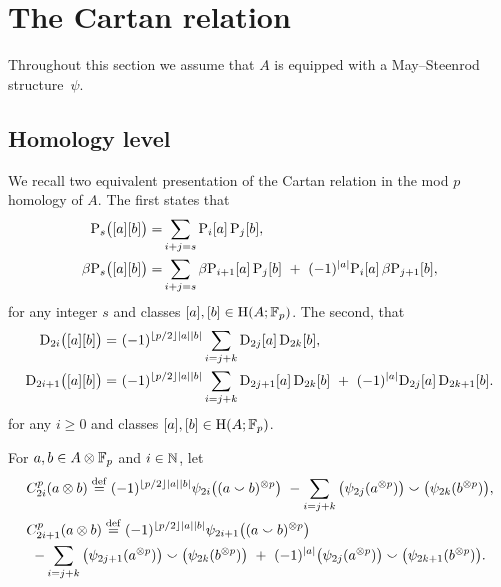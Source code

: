 
\section{The Cartan relation}\label{s:cartan}

Throughout this section we assume that $A$ is equipped with a May--Steenrod structure~$\psi$.

\subsection{Homology level}

We recall two equivalent presentation of the Cartan relation in the mod $p$ homology of $A$.
The first states that
\begin{align*}
	\mathrm{P}_s\big([a][b]\big) =&
	\sum_{i+j=s} \mathrm{P}_i[a] \, \mathrm{P}_j[b], \\
	\beta\mathrm{P}_s\big([a][b]\big) =&
	\sum_{i+j=s} \beta\mathrm{P}_{i+1}[a] \, \mathrm{P}_j[b] \ +\ (-1)^{\lvert a\rvert} \mathrm{P}_i[a] \, \beta\mathrm{P}_{j+1}[b],
\end{align*}
for any integer $s$ and classes $[a],[b] \in \mathrm{H}(A;{\mathbb{F}_p})$.
The second, that
\begin{align*}
	\mathrm{D}_{2i}\big([a][b]\big) =\ &
	(-1)^{\lfloor p/2\rfloor\lvert a\rvert\lvert b\rvert} \sum_{i=j+k} \mathrm{D}_{2j}[a] \, \mathrm{D}_{2k}[b], \\
	\mathrm{D}_{2i+1}\big([a][b]\big) =\ &
	(-1)^{\lfloor p/2\rfloor\lvert a\rvert\lvert b\rvert} \sum_{i=j+k} \mathrm{D}_{2j+1}[a] \, \mathrm{D}_{2k}[b] \ +\ (-1)^{\lvert a\rvert}\mathrm{D}_{2j}[a] \, \mathrm{D}_{2k+1}[b].
\end{align*}
for any $i \geq 0$ and classes $[a],[b] \in \mathrm{H}(A;{\mathbb{F}_p})$.

For $a,b \in A \otimes {\mathbb{F}_p}$ and $i \in \mathbb{N}$, let
\begin{multline*}
	C_{2i}^p(a \ot b) \defeq (-1)^{\floor{p/2}\bars{a}\bars{b}} \psi_{2i}\big((a \smallsmile b)^{\ot p}\big) \ -
	\sum_{i=j+k}\big(\psi_{2j}(a^{\ot p})\big) \smallsmile \big(\psi_{2k}(b^{\ot p})\big), \hfill \\
	C_{2i+1}^p(a \ot b) \defeq (-1)^{\floor{p/2}\bars{a}\bars{b}} \psi_{2i+1}\big((a \smallsmile b)^{\ot p}\big) \hfill \\ -
	\sum_{i=j+k} \big(\psi_{2j+1}(a^{\ot p})\big) \smallsmile \big(\psi_{2k}(b^{\ot p})\big)\ +\
	(-1)^{\bars{a}}\big(\psi_{2j}(a^{\ot p})\big) \smallsmile \big(\psi_{2k+1}(b^{\ot p})\big).
\end{multline*}

